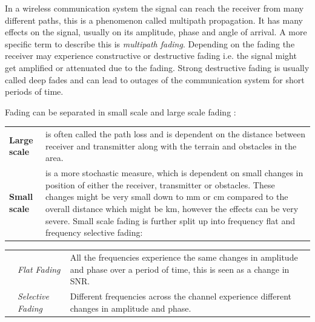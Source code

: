In a wireless communication system the signal can reach the receiver from many different paths, this is a phenomenon called multipath propagation. It has many effects on the signal, usually on its amplitude, phase and angle of arrival.\citep{Fading} A more specific term to describe this is \textit{multipath fading}. Depending on the fading the receiver may experience constructive or destructive fading i.e. the signal might get amplified or attenuated due to the fading. Strong destructive fading is usually called deep fades and can lead to outages of the communication system for short periods of time. 

Fading can be separated in  small scale and large scale fading \citep{FlatSelective}: 

\begin{tabular}{lp{13.1cm}}
\textbf{Large scale} & is often called the path loss and is dependent on the distance between receiver and transmitter along with the terrain and obstacles in the area. \\ 
\textbf{Small scale} & is a more stochastic measure, which is dependent on small changes in position of either the receiver, transmitter or obstacles. These changes might be very small down to mm or cm compared to the overall distance which might be km, however the effects can be very severe. Small scale fading is further split up into frequency flat and frequency selective fading:
\end{tabular}
\begin{tabular}{p{0.3cm}lp{11.7cm}}
&\textit{Flat Fading} & All the frequencies experience the same changes in amplitude and phase over a period of time, this is seen as a change in SNR.\\
&\textit{Selective Fading} & Different frequencies across the channel experience different changes in amplitude and phase. 
\end{tabular}



